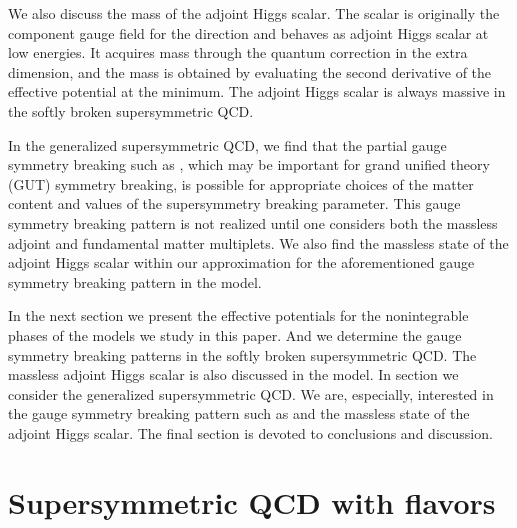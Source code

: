 \documentclass[a4paper,12pt]{article}
\begin{document}
\par
We also discuss the mass of the adjoint Higgs scalar. The scalar 
is originally the component gauge field
for the \coordHE{} direction and behaves as adjoint Higgs scalar at low energies. 
It acquires mass through the quantum correction in the extra 
dimension, and the mass is
obtained by evaluating the second derivative of the effective potential
at the minimum. 
The adjoint Higgs scalar is always massive in the softly 
broken supersymmetric QCD.
\par
In the generalized supersymmetric QCD, we 
find that the partial gauge symmetry breaking 
such as \coordHE{}, which may be important for grand unified 
theory (GUT) symmetry 
breaking, is possible
for appropriate choices of the matter content and values of
the supersymmetry breaking parameter.
This gauge symmetry breaking pattern is not realized until one
considers both the massless adjoint and fundamental matter multiplets.
We also find the massless state of
the adjoint Higgs scalar within our approximation 
for the aforementioned gauge symmetry breaking pattern in the model.
\par
In the next section we present the effective potentials for the
nonintegrable phases of the models we study in this paper. 
And we determine the gauge symmetry breaking patterns
in the softly broken supersymmetric QCD. The massless adjoint 
Higgs scalar is also 
discussed in the model.
In section \coordHE{} we consider the 
generalized supersymmetric QCD.
We are, especially, interested in the gauge
symmetry breaking pattern such as \coordHE{} and the 
massless state of the adjoint Higgs scalar. 
The final section is devoted to conclusions and discussion.
\par
\section{Supersymmetric QCD with \coordHE{} flavors}
\end{document}
